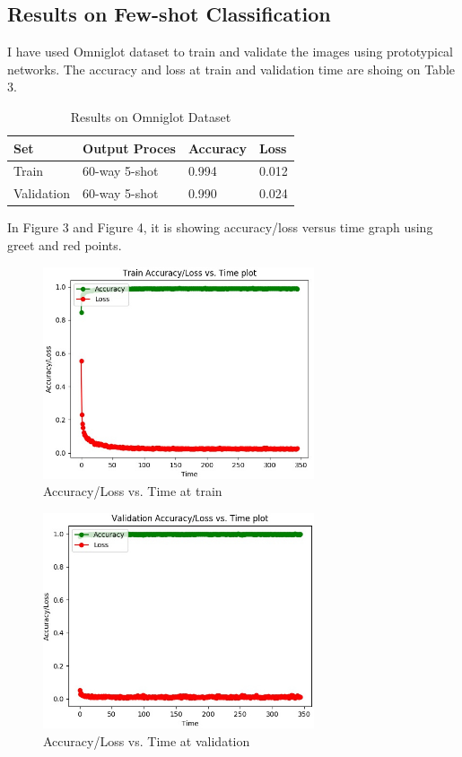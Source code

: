 \documentclass[10pt,twocolumn,letterpaper]{article}
\begin{document}
\subsection{Results on Few-shot Classification}
I have used Omniglot\cite{DBLP:journals/corr/abs-1902-03477} dataset to train and validate the images using prototypical networks. The accuracy and loss at train and validation time are shoing on Table 3.

\begin{table}[h]
\begin{tabular}{ |p{1.5cm}||p{2cm}|p{1cm}|p{1cm}|  }
 \hline
 Set & Output Proces & Accuracy & Loss \\
 \hline
 Train & 60-way 5-shot & 0.994 & 0.012 \\
 \hline
 Validation & 60-way 5-shot & 0.990 & 0.024\\
 \hline
\end{tabular}
\caption{Results on Omniglot Dataset}
\end{table}

In Figure 3 and Figure 4, it is showing accuracy/loss versus time graph using greet and red points.

\begin{figure}[h]
\caption{Accuracy/Loss vs. Time at train}
\includegraphics[width=8cm]{images/train_omniglot_acc_loss_plot.jpg}
\centering
\end{figure}

\begin{figure}[h]
\caption{Accuracy/Loss vs. Time at validation}
\includegraphics[width=8cm]{images/val_omniglot_acc_loss_plot.jpg}
\centering
\end{figure}
 

{\small


}
\end{document}
